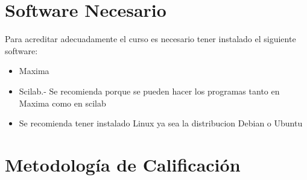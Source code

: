 \documentclass[12pt]{book}
\theoremstyle{definition}
\theoremstyle{remark}
\theoremstyle{plain}
\begin{document}
\section{Software Necesario}

Para acreditar adecuadamente el curso es necesario tener instalado el siguiente software:
\begin{itemize}
 \item Maxima
 \item Scilab.- Se recomienda porque se pueden hacer los programas tanto en Maxima como en scilab
 \item Se recomienda tener instalado Linux ya sea la distribucion Debian o Ubuntu
\end{itemize}

\section{Metodología de Calificación}
\end{document}
